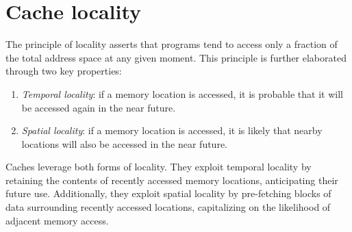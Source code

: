 \section{Cache locality}

The principle of locality asserts that programs tend to access only a fraction of the total address space at any given moment. 
This principle is further elaborated through two key properties:
\begin{enumerate}
    \item \textit{Temporal locality}: if a memory location is accessed, it is probable that it will be accessed again in the near future.
    \item \textit{Spatial locality}: if a memory location is accessed, it is likely that nearby locations will also be accessed in the near future.
\end{enumerate}
Caches leverage both forms of locality. 
They exploit temporal locality by retaining the contents of recently accessed memory locations, anticipating their future use. 
Additionally, they exploit spatial locality by pre-fetching blocks of data surrounding recently accessed locations, capitalizing on the likelihood of adjacent memory access.

